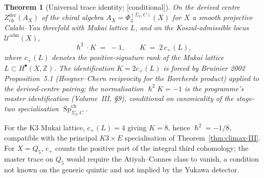 \documentclass[11pt,reqno]{amsart}
\theoremstyle{plain}
\newtheorem{theorem}{Theorem}[section]
\theoremstyle{definition}
\theoremstyle{remark}
\providecommand{\ClaimStatusConditional}{\textnormal{[conditional]}}
\DeclareMathOperator{\Sp}{Sp}
\newcommand{\Zbb}{\mathbb{Z}}
\newcommand{\cU}{\mathcal{U}}
\newcommand{\hbar}{{\hslash}}
\begin{document}
\begin{theorem}[Universal trace identity; \ClaimStatusConditional]
\label{thm:climax-IV}
On the derived centre $Z^{\mathrm{der}}_{\mathrm{ch}}(A_X)$ of the chiral algebra $A_X = \Phi_3^{(\Sigma_2,C)}(X)$ for $X$ a smooth projective Calabi--Yau threefold with Mukai lattice $L$, and on the Koszul-admissible locus $\cU^{\mathrm{adm}}(X)$,
\[
  \hbar^2 \cdot K \;=\; -1, \qquad K \;=\; 2\,c_+(L),
\]
where $c_+(L)$ denotes the positive-signature rank of the Mukai lattice $L \subset H^\bullet(X, \Zbb)$. The identification $K = 2c_+(L)$ is forced by Bruinier 2002 Proposition~5.1 (Heegner--Chern reciprocity for the Borcherds product) applied to the derived-centre pairing; the normalisation $\hbar^2 K = -1$ is the programme's master identification (Volume~III, \S9), conditional on canonicality of the stage-two specialisation $\Sp^{\mathrm{ch}}_{\Sigma_2, C}$.
\end{theorem}

For the K3 Mukai lattice, $c_+(L) = 4$ giving $K = 8$, hence
$\hbar^2 = -1/8$, compatible with the principal $K3\times E$
specialisation of Theorem~\ref{thm:climax-III}. For $X = Q_5$, $c_+$
counts the positive part of the integral third cohomology; the master
trace on $Q_5$ would require the Atiyah--Connes class to vanish, a
condition not known on the generic quintic and not implied by the
Yukawa detector.
\end{document}

